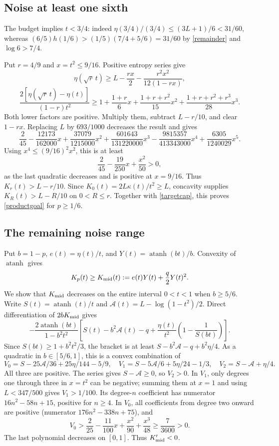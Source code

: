 \documentclass[11pt]{article}
\newcommand{\atanh}{\operatorname{atanh}}
\numberwithin{equation}{section}
\begin{document}
\subsection{Noise at least one sixth}
The budget implies $t<3/4$: indeed $\eta(3/4)/(3/4)\le(3L+1)/6<31/60$, whereas $(6/5)h(1/6)>(1/5)(7/4+5/6)=31/60$ by \eqref{remainder} and $\log6>7/4$.

Put $r=4/9$ and $x=t^2\le9/16$. Positive entropy series give
\[
 \eta(\sqrt r\,t)\ge L-\frac{rx}{2}-\frac{r^2x^2}{12(1-rx)},
\]
\[
 \frac{2[\eta(\sqrt r\,t)-\eta(t)]}{(1-r)t^2}
 \ge1+\frac{1+r}{6}x+\frac{1+r+r^2}{15}x^2
       +\frac{1+r+r^2+r^3}{28}x^3.
\]
Both lower factors are positive. Multiply them, subtract $L-r/10$, and clear $1-rx$. Replacing $L$ by $693/1000$ decreases the result and gives
\[
 \frac2{45}-\frac{12173}{162000}x+\frac{37079}{1215000}x^2
 +\frac{601643}{131220000}x^3-\frac{9815357}{413343000}x^4
 +\frac{6305}{1240029}x^5.
\]
Using $x^4\le(9/16)^2x^2$, this is at least
\[
 \frac2{45}-\frac{19}{250}x+\frac{x^2}{50}>0,
\]
as the last quadratic decreases and is positive at $x=9/16$. Thus $K_r(t)>L-r/10$. Since $K_0(t)=2L\kappa(t)/t^2\ge L$, concavity supplies $K_R(t)>L-R/10$ on $0<R\le r$. Together with \eqref{targetcap}, this proves \eqref{productgoal} for $p\ge1/6$.

\subsection{The remaining noise range}
Put $b=1-p$, $e(t)=\eta(t)/t$, and $Y(t)=\atanh(bt)/b$. Convexity of $\atanh$ gives
\begin{equation}\label{midpoint}
 K_p(t)\ge K_{\rm mid}(t):=e(t)Y(t)+\frac q2Y(t)^2.
\end{equation}
We show that $K_{\rm mid}$ decreases on the entire interval $0<t<1$ when $b\ge5/6$.
Write $S(t)=\atanh(t)/t$ and $\mathscr A(t)=L-\log(1-t^2)/2$. Direct differentiation of $2bK_{\rm mid}$ gives
\[
 -\frac{2\atanh(bt)}{1-b^2t^2}
 \left[S(t)-b^2\mathscr A(t)-q
 +\frac{\eta(t)}{t^2}\left(1-\frac1{S(bt)}\right)\right].
\]
Since $S(bt)\ge1+b^2t^2/3$, the bracket is at least
$S-b^2\mathscr A-q+b^2\eta/4$. As a quadratic in $b\in[5/6,1]$, this is a convex combination of
\[
 V_0=S-25\mathscr A/36+25\eta/144-5/9,\quad
 V_1=S-5\mathscr A/6+5\eta/24-1/3,\quad
 V_2=S-\mathscr A+\eta/4.
\]
All three are positive. The series gives $S-\mathscr A\ge0$, so $V_2>0$. In $V_1$, only degrees one through three in $x=t^2$ can be negative; summing them at $x=1$ and using $L<347/500$ gives $V_1>1/100$. Its degree-$n$ coefficient has numerator $16n^2-58n+15$, positive for $n\ge4$. In $V_0$, all coefficients from degree two onward are positive (numerator $176n^2-338n+75$), and
\[
 V_0>\frac2{25}-\frac{11}{100}x+\frac{x^2}{90}+\frac{x^3}{48}
 \ge\frac7{3600}>0.
\]
The last polynomial decreases on $[0,1]$. Thus $K_{\rm mid}'<0$.
\end{document}
